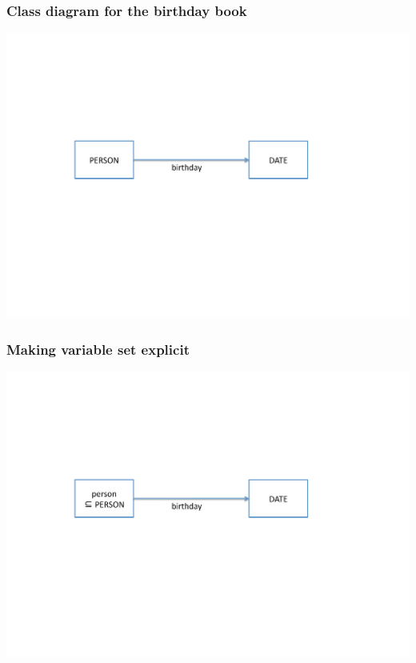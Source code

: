 \documentclass{beamer}
\begin{document}
\begin{frame} \frametitle{Class diagram for the birthday book}

  \begin{center}
    \includegraphics[scale=.5]{bb1}
  \end{center}

\end{frame}




\begin{frame} \frametitle{Making variable set explicit}

  \begin{center}
    \includegraphics[scale=.5]{bb2}
  \end{center}

\end{frame}
\end{document}
